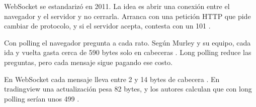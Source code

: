 WebSocket se estandarizó en 2011. La idea es abrir una conexión entre el navegador y el servidor y no
cerrarla. Arranca con una petición HTTP que pide cambiar de protocolo, y si el servidor acepta, contesta
con un 101 \cite[secc.~2.4]{Murley2021}.

Con polling el navegador pregunta a cada rato. Según Murley y su equipo, cada ida y vuelta gasta cerca de
590 bytes solo en cabeceras \cite[p.~1197]{Murley2021}. Long polling reduce las preguntas, pero cada
mensaje sigue pagando ese costo.

En WebSocket cada mensaje lleva entre 2 y 14 bytes de cabecera \cite[secc.~2.4]{Murley2021}. En
tradingview una actualización pesa 82 bytes, y los autores calculan que con long polling serían unos 499
\cite[p.~1197]{Murley2021}.
